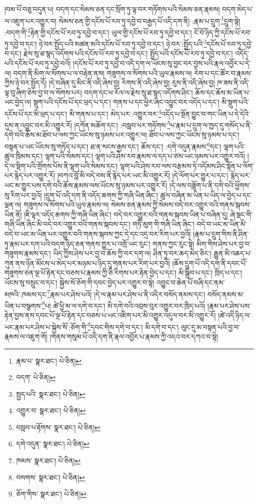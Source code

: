 །བམ་པོ་བཅུ་བདུན་པ། བདག་དང་སེམས་ཅན་དང་སྲོག་ཏུ་ལྟ་བར་གཏོགས་པའི་སེམས་ཅན་རྣམས། བདག་མེད་པ་ལ་འཇུག་པར་འགྱུར་བ། སེམས་ཅན་གྱི་དངོས་པོ་རབ་ཏུ་དབྱེ་བ་བརྒྱད་པོ་འདི་དག་ནི། :རྣམ་པ་དྲུག་\footnote{རྣམ་པ་  སྣར་ཐང་།  པེ་ཅིན། }དྲུག་སྟེ། :བདག་གི་\footnote{བདག་  པེ་ཅིན། }རྟེན་གྱི་དངོས་པོ་རབ་ཏུ་དབྱེ་བ་དང་། ཡུལ་གྱི་དངོས་པོ་རབ་ཏུ་དབྱེ་བ་དང་། ངོ་བོ་ཉིད་ཀྱི་དངོས་པོ་རབ་ཏུ་དབྱེ་བ་དང་། ཉེ་བར་སྤྱོད་པའི་མཚན་མའི་དངོས་པོ་རབ་ཏུ་དབྱེ་བ་དང་། ཉེ་བར་:སྤྱོད་པའི་\footnote{སྤྱད་པའི་  སྣར་ཐང་།  པེ་ཅིན། }དངོས་པོ་རབ་ཏུ་དབྱེ་བ་དང་། རྗེས་སུ་ཐ་སྙད་འདོགས་པའི་དངོས་པོ་རབ་ཏུ་དབྱེ་བ་དང་། སྤྱོད་པའི་དངོས་པོ་རབ་ཏུ་དབྱེ་བ་དང་། འདོད་པའི་དངོས་པོ་རབ་ཏུ་དབྱེ་བའོ། །དངོས་པོ་རབ་ཏུ་དབྱེ་བ་འདི་དག་ལ་ཡོངས་སུ་བྱང་བར་བྱས་པའི་རྣལ་འབྱོར་པ་དེ་ལ། བདག་ནི་མིག་ལ་སོགས་པ་ལ་བརྟེན་ནས། གཟུགས་ལ་སོགས་པའི་ཡུལ་རྣམས་ལ། རེག་པ་དང་ཚོར་བ་རྣམས་ཀྱིས་ཉེ་བར་སྤྱོད་དོ། །དེ་བཞིན་དུ་མིང་ནི་འདི་ཞེས་བྱ། རིགས་ནི་འདི་ཞེས་བྱ། རུས་ནི་འདི་ཞེས་བྱ། ཁ་ཟས་ནི་འདི་ལྟ་བུ་ཞིག་ཅེས་བྱ་བ་ལ་སོགས་པར། བདག་དང་ཕ་རོལ་ལ་རྗེས་སུ་ཐ་སྙད་འདོགས་ཤིང་། ཆོས་དང་ཆོས་མ་ཡིན་པ་ཡང་བྱེད་ལ། སྡུག་པའི་དངོས་པོ་དང་ཕྲད་པ་དང་། གནས་པ་དང་ཕྱིར་ཞིང་འབྱུང་བར་འདོད་པ་དང་། མི་སྡུག་པའི་དངོས་པོ་དང་མི་ཕྲད་པ་དང་། མི་གནས་པ་དང་། མེད་པར་:འགྱུར་བར་\footnote{འགྱུར་བ་  སྣར་ཐང་།  པེ་ཅིན། }འདོད་པ་སྔོན་བྱུང་བ་གང་ཡིན་པ་དེ་དེའི་དུས་ན་འབྱུང་བར་མི་འགྱུར་རོ། །དཀོན་མཆོག་དང་། :བསླབ་པར་གཏོགས་\footnote{བསླབ་པ་རྟོགས་  སྣར་ཐང་།  པེ་ཅིན། }པ་རྣམ་པ་དྲུག་ལ་ཁྱད་དུ་གསོད་པ་ནི་དགེ་བའི་ཆོས་མ་ཐོབ་པ་ལས་ཀྱང་ཡོངས་སུ་ཉམས་པར་འགྱུར་ལ། ཐོབ་པ་ལས་ཀྱང་ཡོངས་སུ་ཉམས་པ་དང་། བསྟན་པ་ཡང་ཡོངས་སུ་གཏོད་པ་དང་། ཐ་ན་སངས་རྒྱས་དང་། ཆོས་དང་། :དགེ་འདུན་རྣམས་\footnote{དགེ་འདུན་  སྣར་ཐང་།  པེ་ཅིན། }དང་། ལྷག་པའི་ཚུལ་ཁྲིམས་དང་། ལྷག་པའི་སེམས་དང་། ལྷག་པའི་ཤེས་རབ་རྣམས་ལ་དད་པ་ཙམ་ཡང་ཉམས་པར་འགྱུར་བའོ། །དེ་ལ་སྡིག་པའི་གྲོགས་པོས་ནི་ལྷག་པའི་སེམས་དང་། ལྷག་པའི་ཤེས་རབ་ལས་བརྩམས་ཏེ་འདོམས་ཤིང་སྟོན་པ་ལོག་པར་རྙེད་པར་འགྱུར་རོ། །བཀའ་བློ་མི་བདེ་བས་ནི་རྙེད་པར་ཡང་མི་འགྱུར་རོ། །དེ་ལོག་པར་གྱུར་པ་དང་། རྙེད་པར་ཡང་མ་གྱུར་པས་དགེ་བའི་ཆོས་རྣམས་ལས་ཡོངས་སུ་ཉམས་པར་འགྱུར་རོ། །དེ་ལས་བཟློག་པ་ནི་དགེ་བའི་ཕྱོགས་སུ་རིག་པར་བྱའོ། །དྲུག་པོ་འདི་དག་ནི་འདོད་ཆགས་ཀྱི་གཞི་ཡིན་ཞིང་། ཚུལ་བཞིན་མ་ཡིན་པ་ཡིད་ལ་བྱེད་པ་དང་ལྡན་ལ། གཟུགས་ལ་སོགས་པའི་ཡུལ་རྣམས་ལ། སེམས་ཅན་རྣམས་ཀྱི་སེམས་བདེ་བར་འགྱུར་བའི་གནས་སྐབས་ཡིན་ནོ། །ཇི་ལྟར་འདོད་ཆགས་ཀྱི་གཞི་ཡིན་ཞིང་། བདེ་བར་འགྱུར་བའི་གནས་སྐབས་ཡིན་པ་བཞིན་དུ། ཞེ་སྡང་གི་གཞི་ཡིན་ཞིང་མི་བདེ་བར་འགྱུར་བའི་གནས་སྐབས་དང་། གཏི་མུག་གི་གཞི་ཡིན་ཞིང་། བདེ་བ་ཡང་མ་ཡིན་མི་བདེ་བ་ཡང་མ་ཡིན་པར་འགྱུར་བའི་གནས་སྐབས་ཀྱང་དེ་དང་འདྲ་བར་རིག་པར་བྱའོ། །རྣམ་པ་དྲུག་གིས་ནི་ཤིན་ཏུ་རྣམ་པར་དག་པའི་བདག་ཉིད་ཅན་གནས་གྱུར་པ་འགྲོ་ཡང་རུང་། གནས་ཀྱང་རུང་སྟེ། མིག་གིས་ཤེས་པར་བྱ་བ་གཟུགས་རྣམས་དང་། ཡིད་ཀྱིས་ཤེས་པར་བྱ་བ་ཆོས་ཀྱི་བར་དག་ལ། ཤིན་ཏུ་བར་ཆད་མེད་ཅིང་། རྒྱུན་མི་འཆད་པ་ཀུན་ནས་ཉོན་མོངས་པ་མེད་པར་མཉམ་པ་ཉིད་དུ་གནས་པར་རིག་པར་བྱའོ། །ཆོས་དྲུག་པོ་འདི་དག་ནི་དབང་པོ་གཟུགས་ཅན་ལྔ་པོ་རྟེན་དང་བཅས་པ་རྣམས་ཀྱི་ཅི་རིགས་པར་རྟེན་བྱེད་པ་དང་། མི་སྒྲིབ་པ་དང་། ཁྲིད་པ་དང་། ཡོངས་སུ་བསྲུང་བ་དང་། སྐྱེས་སོ་ཅོག་གི་དབང་བྱེད་པར་འགྱུར་བ་སྟེ། འབྱུང་བ་ཆེན་པོ་བཞི་དང་ནམ་མཁའི་:ཁམས་དང་\footnote{ཁམས་  སྣར་ཐང་།  པེ་ཅིན། }རྣམ་པར་ཤེས་པའོ། །དེ་ལ་རྣམ་པར་ཤེས་པ་ནི་འདིར་བསོད་ནམས་དང་། བསོད་ནམས་མ་ཡིན་པ་བསྩགས་\footnote{བསགས་  སྣར་ཐང་།  པེ་ཅིན། }པ། ཚེ་ཕྱི་མ་ལ་དགེ་བ་དང་། མི་དགེ་བའི་འབྲས་བུར་འགྱུར་བར་ཁྲིད་པའོ། །རྣམ་པར་ཤེས་པས་རྟེན་བྱས་ནས་དབང་པོ་ལྔ་པོ་རྟེན་དང་བཅས་པ་ཡང་འཇིག་པར་མི་འགྱུར་འདུལ་བར་མི་འགྱུར་རོ། །ཚེ་འདི་ཉིད་ལ་ཡང་རྣམ་པར་ཤེས་པ་སྐྱེས་སོ་:ཅོག་གི་\footnote{ཅོག་གིས་  སྣར་ཐང་།  པེ་ཅིན། }དབང་གིས་དགེ་བ་དང་། མི་དགེ་བ་དང་། ལུང་དུ་མ་བསྟན་པའི་བྱ་བ་རྣམས་ལ་འཇུག་གོ། །གནས་གསུམ་པོ་འདི་དག་ནི་རྣལ་འབྱོར་པ་རྣམས་ཀྱི་འདའ་བར་དཀའ་བ་སྟེ། 